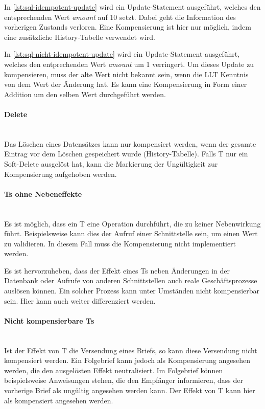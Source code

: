In \cref{lst:sql-idempotent-update} wird ein Update-Statement ausgeführt, welches den entsprechenden Wert \textit{amount} auf 10 setzt. Dabei geht die Information des vorherigen Zustands verloren. Eine Kompensierung ist hier nur möglich, indem eine zusätzliche History-Tabelle verwendet wird. 

In \cref{lst:sql-nicht-idempotent-update} wird ein Update-Statement ausgeführt, welches den entprechenden Wert \textit{amount} um 1 verringert. Um dieses Update zu kompensieren, muss der alte Wert nicht bekannt sein, wenn die LLT Kenntnis von dem Wert der Änderung hat. Es kann eine Kompensierung in Form einer Addition um den selben Wert durchgeführt werden. 

\paragraph*{Delete} \mbox{}\\
Das Löschen eines Datensätzes kann nur kompensiert werden, wenn der gesamte Eintrag vor dem Löschen gespeichert wurde (History-Tabelle). Falls T nur ein Soft-Delete ausgelöst hat, kann die Markierung der Ungültigkeit zur Kompensierung aufgehoben werden.

\paragraph*{Ts ohne Nebeneffekte} \mbox{}\\
Es ist möglich, dass ein T eine Operation durchführt, die zu keiner Nebenwirkung führt. Beispielsweise kann dies der Aufruf einer Schnittstelle sein, um einen Wert zu validieren. In diesem Fall muss die Kompensierung nicht implementiert werden. 

Es ist hervorzuheben, dass der Effekt eines Ts neben Änderungen in der Datenbank oder Aufrufe von anderen Schnittstellen auch reale Geschäftsprozesse auslösen können. Ein solcher Prozess kann unter Umständen nicht kompensierbar sein. Hier kann auch weiter differenziert werden. 

\paragraph*{Nicht kompensierbare Ts} \mbox{}\\
Ist der Effekt von T die Versendung eines Briefs, so kann diese Versendung nicht kompensiert werden. Ein Folgebrief kann jedoch als Kompensierung angesehen werden, die den ausgelösten Effekt neutralisiert. Im Folgebrief können beispielsweise Anweisungen stehen, die den Empfänger informieren, dass der vorherige Brief als ungültig angesehen werden kann. Der Effekt von T kann hier als kompensiert angesehen werden. 

